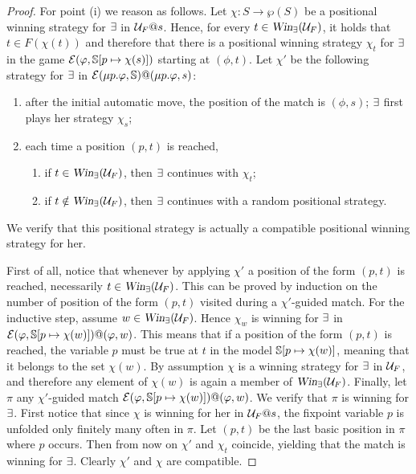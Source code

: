 \begin{proof}
For point (i) we reason as follows. 
Let $\chi: S \to \wp{(S)}$  be a positional winning strategy for $\exists$ in $\mathcal{U}_F@s$. 
Hence, for every $t \in \win_{\eloise}(\UG_{F})$, it holds that $t \in F(\chi(t))$ 
and therefore that there is a positional winning strategy $\chi_t$ for $\exists$ 
in the game $\mathcal{E}(\varphi,\mathbb{S}[p \mapsto \chi(s)])$ starting at $(\phi,t)$. 
Let $\chi'$ be the following strategy for $\exists$ in
$\mathcal{E}(\mu p.\varphi,\mathbb{S})@(\mu p.\varphi,s)$:
\begin{enumerate}
\item after the initial automatic move, the position of the match is $(\phi,s)$; 
$\exists$ first plays her strategy $\chi_s$;
\item each time a position $(p,t)$ is reached, 
\begin{enumerate}
\item if $t \in \win_{\eloise}(\UG_{F})$, then $\exists$ continues with $\chi_t$;
\item if $t \notin \win_{\eloise}(\UG_{F})$, then $\exists$ continues with a random positional strategy.
\end{enumerate}
\end{enumerate}
We verify that this positional strategy is actually a compatible positional winning strategy for her.

First of all, notice that whenever by applying $\chi'$ a position of the form $(p,t)$ is reached,  necessarily $t \in \win_{\eloise}(\UG_{F})$. This can be proved by induction on the number of position of the form $(p,t)$ visited during a $\chi'$-guided match. For the inductive step, assume $w \in \win_{\eloise}(\UG_{F})$. Hence $\chi_w$ is winning for $\exists$ in  $\mathcal{E}(\varphi,\mathbb{S}[p \mapsto \chi(w)])@(\varphi,w)$. This means that if a position of the form $(p, t)$ is reached, the variable $p$ must be true at $t$ in the model $\mathbb{S}[p \mapsto \chi(w)]$, meaning that it belongs to the set $\chi(w)$. By assumption $\chi$ is a winning strategy for $\exists$ in $\mathcal{U}_F$, and therefore any element of $\chi(w)$ is again a member of $ \win_{\eloise}(\UG_{F})$. 
Finally, let $\pi$ any $\chi'$-guided match $\mathcal{E}(\varphi,\mathbb{S}[p \mapsto \chi(w)])@(\varphi,w)$. We verify that $\pi$  is winning for $\exists$. First notice that since $\chi$ is winning for her in $\mathcal{U}_F@s$, the fixpoint variable $p$ is unfolded only finitely many often in $\pi$. 
Let $(p,t)$ be the last basic position in $\pi$ where $p$ occurs. Then from now on $\chi'$ and $\chi_t$ coincide, yielding  that the match is winning for $\exists$. Clearly $\chi'$ and $\chi$ are compatible.



\end{proof}
